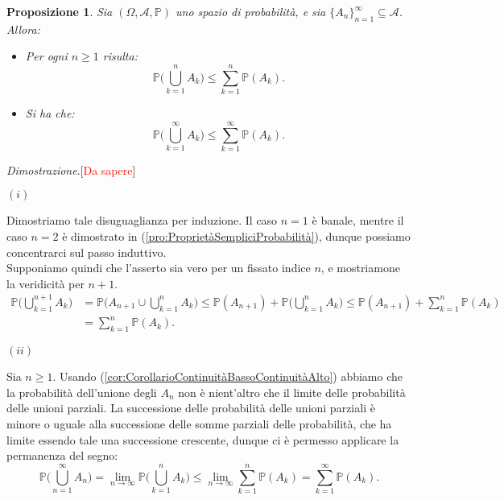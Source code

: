 \documentclass[11pt]{book}
\makeatletter
\theoremstyle{Definizione}
\theoremstyle{TeoremaProposizioneLemmaCorollario}
\newtheorem{mypropo}[myteo]{Proposizione}
\theoremstyle{OsservazioneNota}
\renewenvironment{proof}[1][\proofname]{\par
  \normalfont \topsep6\p@\@plus6\p@\relax
  \trivlist
  \item[\hskip\labelsep
        \itshape
    #1\@addpunct{.}]\ignorespaces
}{%
  \endtrivlist\@endpefalse
}
\renewcommand{\P}{\mathbb{P}}
\renewenvironment{proof}{\textsl{Dimostrazione}.}{}
\makeatother
\begin{document}
\begin{boxpro}
\begin{mypropo}
Sia $(\Omega,\mathcal{A},\P)$ uno spazio di probabilità, e sia $\{A_n\}_{n = 1}^\infty \subseteq \mathcal{A}$. Allora:
\begin{itemize}
\item[$(i)$] Per ogni $n \geq 1$ risulta:
$$
\P\Bigg(\bigcup_{k = 1}^n A_k\Bigg) \leq \sum_{k = 1}^n \P(A_k).
$$
\item[$(ii)$] Si ha che:
$$
\P\Bigg(\bigcup_{k = 1}^\infty A_k\Bigg) \leq \sum_{k = 1}^\infty \P(A_k).
$$
\end{itemize}
\end{mypropo}
\tcblower
\begin{proof}[\textcolor{red}{Da sapere}]
\hfill
\begin{flushleft}
$(i)$
\end{flushleft}
Dimostriamo tale disuguaglianza per induzione. Il caso $n = 1$ è banale, mentre il caso $n = 2$ è dimostrato in (\ref{pro:ProprietàSempliciProbabilità}), dunque possiamo concentrarci sul passo induttivo.\\
Supponiamo quindi che l'asserto sia vero per un fissato indice $n$, e mostriamone la veridicità per $n+1$.
\begin{align*}
\P\Bigg(\bigcup_{k = 1}^{n+1} A_k\Bigg) &= \P\Bigg(A_{n+1}\cup \bigcup_{k = 1}^{n} A_k\Bigg) \leq \P(A_{n+1})+ \P\Bigg(\bigcup_{k = 1}^n A_k \Bigg) \leq \P(A_{n+1})+ \sum_{k = 1}^n \P(A_k)\\
&= \sum_{k = 1}^n \P(A_k).
\end{align*}
\begin{flushleft}
$(ii)$
\end{flushleft}
Sia $n \geq 1$. Usando (\ref{cor:CorollarioContinuitàBassoContinuitàAlto}) abbiamo che la probabilità dell'unione degli $A_n$ non è nient'altro che il limite delle probabilità delle unioni parziali. La successione delle probabilità delle unioni parziali è minore o uguale alla successione delle somme parziali delle probabilità, che ha limite essendo tale una successione crescente, dunque ci è permesso applicare la permanenza del segno:  
$$
\P\Bigg(\bigcup_{n = 1}^\infty A_n\Bigg) = \lim_{n \to \infty} \P\Bigg(\bigcup_{k = 1}^n A_k\Bigg)\leq \lim_{n \to \infty}\sum_{k = 1}^n \P(A_k) = \sum_{k = 1}^\infty \P(A_k).
$$

\end{proof}
\end{boxpro}
\end{document}
